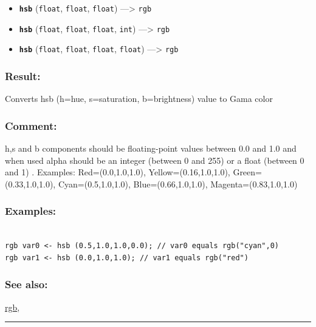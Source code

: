 \documentclass[]{book}
\providecommand{\tightlist}{%
  \setlength{\itemsep}{0pt}\setlength{\parskip}{0pt}}
\theoremstyle{definition}
\theoremstyle{definition}
\theoremstyle{definition}
\theoremstyle{remark}
\begin{document}
\begin{itemize}
\tightlist
\item
  \textbf{\texttt{hsb}} (\texttt{float}, \texttt{float}, \texttt{float})
  ---\textgreater{} \texttt{rgb}
\item
  \textbf{\texttt{hsb}} (\texttt{float}, \texttt{float}, \texttt{float},
  \texttt{int}) ---\textgreater{} \texttt{rgb}
\item
  \textbf{\texttt{hsb}} (\texttt{float}, \texttt{float}, \texttt{float},
  \texttt{float}) ---\textgreater{} \texttt{rgb}
\end{itemize}

\subsubsection{Result:}\label{result-251}

Converts hsb (h=hue, s=saturation, b=brightness) value to Gama color

\subsubsection{Comment:}\label{comment-50}

h,s and b components should be floating-point values between 0.0 and 1.0
and when used alpha should be an integer (between 0 and 255) or a float
(between 0 and 1) . Examples: Red=(0.0,1.0,1.0), Yellow=(0.16,1.0,1.0),
Green=(0.33,1.0,1.0), Cyan=(0.5,1.0,1.0), Blue=(0.66,1.0,1.0),
Magenta=(0.83,1.0,1.0)

\subsubsection{Examples:}\label{examples-200}

\begin{verbatim}
 
rgb var0 <- hsb (0.5,1.0,1.0,0.0); // var0 equals rgb("cyan",0) 
rgb var1 <- hsb (0.0,1.0,1.0); // var1 equals rgb("red")
\end{verbatim}

\subsubsection{See also:}\label{see-also-113}

\href{operators-n-to-r.html\#rgb}{rgb},

\begin{center}\rule{0.5\linewidth}{\linethickness}\end{center}
\end{document}
